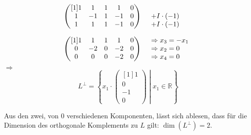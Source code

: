 \documentclass[main.tex]{subfiles}
\begin{document}
\begin{equation*}
    \begin{array}{ r l }
    \begin{pmatrix}[1]
    1 & 1 & 1 & 1 & 0\\
    1 & -1 & 1 & -1 & 0\\
    1 & 1 & 1 & -1 & 0
    \end{pmatrix} & \begin{array}{ l }
    \\
    +I\cdotp ( -1)\\
    +I\cdotp ( -1)
    \end{array}\vspace*{4mm}\\
    \begin{pmatrix}[1]
    1 & 1 & 1 & 1 & 0\\
    0 & -2 & 0 & -2 & 0\\
    0 & 0 & 0 & -2 & 0
    \end{pmatrix} & \begin{array}{ l }
    \Rightarrow x_{3} =-x_{1}\\
    \Rightarrow x_{2} =0\\
    \Rightarrow x_{4} =0
    \end{array}
    \end{array}
\end{equation*}
$\Rightarrow $
\begin{equation*}
    L^{\perp } =\left\{x_{1} \cdotp \begin{pmatrix}[1]
    1\\
    0\\
    -1\\
    0
    \end{pmatrix}\middle| x_{1} \in \mathbb{R}\right\}
\end{equation*}

Aus den zwei, von $0$ verschiedenen Komponenten, lässt sich ablesen, dass für die Dimension des orthogonale Komplements zu $L$ gilt: $\dim\left( L^{\perp }\right) =2$.
\end{document}
